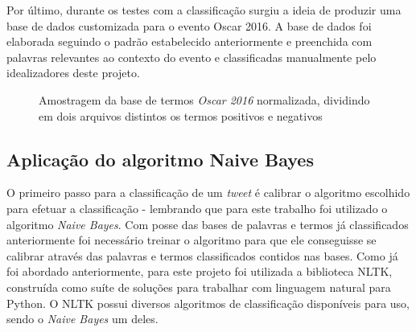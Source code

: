 Por último, durante os testes com a classificação surgiu a ideia de produzir uma base de dados customizada para o evento Oscar 2016. A base de dados foi elaborada seguindo o padrão estabelecido anteriormente e preenchida com palavras relevantes ao contexto do evento e classificadas manualmente pelo idealizadores deste projeto.

\begin{figure}[H]
	
	\center
	\qquad
	\caption{Amostragem da base de termos \textit{Oscar 2016} normalizada, dividindo em dois arquivos distintos os termos positivos e negativos}
	
\end{figure}

\subsection{Aplicação do algoritmo Naive Bayes}
O primeiro passo para a classificação de um \textit{tweet} é calibrar o algoritmo escolhido para efetuar a classificação - lembrando que para este trabalho foi utilizado o algoritmo \textit{Naive Bayes}. Com posse das bases de palavras e termos já classificados anteriormente foi necessário treinar o algoritmo para que ele conseguisse se calibrar através das palavras e termos classificados contidos nas bases. 
Como já foi abordado anteriormente, para este projeto foi utilizada a biblioteca NLTK, construída como suíte de soluções para trabalhar com linguagem natural para Python. O NLTK possui diversos algoritmos de classificação disponíveis para uso, sendo o \textit{Naive Bayes} um deles.

